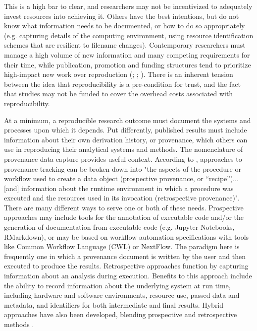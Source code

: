 \noindent This is a high bar to clear, and researchers may not be incentivized to
adequately invest resources into achieving it. Others have the best intentions,
but do not know what information needs to be documented, or how to do so
appropriately (e.g. capturing details of the computing environment, using
resource identification schemes that are resilient to filename changes).
Contemporary researchers must manage a high volume of new information and many
competing requirements for their time, while publication, promotion and funding
structures tend to prioritize high-impact new work over reproduction
(\cite{community_turing_2021}; \cite{shiffrin_scientific_2018}; \cite{munafo_manifesto_2017}).
There is an inherent tension between the idea that reproducibility is a
pre-condition for trust, and the fact that studies may not be funded to cover
the overhead costs associated with reproducibility.

At a minimum, a reproducible research outcome must document the systems and
processes upon which it depends. Put differently, published results must include
information about their own derivation history, or provenance, which others can
use in reproducing their analytical systems and methods. The nomenclature of
provenance data capture provides useful context. According to \textcite[149]{hutchison_applying_2006},
approaches to provenance tracking can be broken down into "the aspects of the
procedure or workflow used to create a data object (prospective provenance, or
“recipe”)... [and] information about the runtime environment in which a
procedure was executed and the resources used in its invocation (retrospective
provenance)". There are many different ways
to serve one or both of these needs. Prospective approaches may include tools
for the annotation of executable code and/or the generation of documentation
from executable code (e.g. Jupyter Notebooks, RMarkdown), or may be based on
workflow automation specifications with tools like Common Workflow Language
(CWL) or NextFlow. The paradigm here is frequently one in which a provenance
document is written by the user and then executed to produce the results.
Retrospective approaches function by capturing information about an analysis
during execution. Benefits to this approach include the ability to record
information about the underlying system at run time, including hardware and
software environments, resource use, passed data and metadata, and identifiers
for both intermediate and final results. Hybrid approaches have also been
developed, blending prospective and retrospective methods \parencite{zhang_revealing_2017}.


